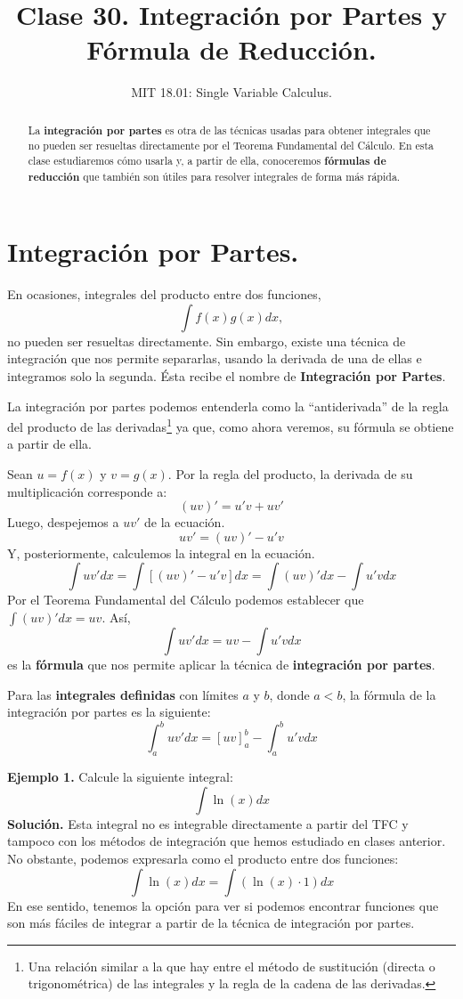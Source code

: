 \documentclass[12pt]{article}
\title{Clase 30. Integración por Partes y Fórmula de Reducción.}
\author{MIT 18.01: Single Variable Calculus.}
\date{}
\begin{document}
\maketitle

\begin{abstract}
\noindent La \textbf{integración por partes} es otra de las técnicas usadas para obtener integrales que no pueden ser resueltas directamente por el Teorema Fundamental del Cálculo. En esta clase estudiaremos cómo usarla y, a partir de ella, conoceremos \textbf{fórmulas de reducción} que también son útiles para resolver integrales de forma más rápida.
\end{abstract}

\section{Integración por Partes.}

En ocasiones, integrales del producto entre dos funciones,
\[
  \int f(x)g(x) dx,
\]
no pueden ser resueltas directamente. Sin embargo, existe una técnica de integración que nos permite separarlas, usando la derivada de una de ellas e integramos solo la segunda. Ésta recibe el nombre de \textbf{Integración por Partes}.

La integración por partes podemos entenderla como la ``antiderivada'' de la regla del producto de las derivadas\footnote{Una relación similar a la que hay entre el método de sustitución (directa o trigonométrica) de las integrales y la regla de la cadena de las derivadas.} ya que, como ahora veremos, su fórmula se obtiene a partir de ella.

Sean $u = f(x)$ y $v = g(x)$. Por la regla del producto, la derivada de su multiplicación corresponde a:
\[
  (uv)' = u'v + uv'
\]
Luego, despejemos a $uv'$ de la ecuación.
\[
  uv' = (uv)' - u'v
\]
Y, posteriormente, calculemos la integral en la ecuación.
\[
  \int uv' dx = \int [(uv)' - u'v] dx = \int (uv)' dx - \int u'v dx
\]
Por el Teorema Fundamental del Cálculo podemos establecer que $\int (uv)' dx = uv$. Así,
\[
  \int uv' dx = uv - \int u'v dx
\]
es la \textbf{fórmula} que nos permite aplicar la técnica de \textbf{integración por partes}.

Para las \textbf{integrales definidas} con límites $a$ y $b$, donde $a < b$, la fórmula de la integración por partes es la siguiente:
\[
  \int_{a}^{b} uv' dx = [uv]_{a}^{b} - \int_{a}^{b} u'v dx
\]

\textbf{Ejemplo 1.} Calcule la siguiente integral:
\[
  \int \ln(x) dx
\]
\textbf{Solución.} Esta integral no es integrable directamente a partir del TFC y tampoco con los métodos de integración que hemos estudiado en clases anterior. No obstante, podemos expresarla como el producto entre dos funciones:
\[
  \int \ln(x)dx = \int (\ln(x) \cdot 1) dx
\]
En ese sentido, tenemos la opción para ver si podemos encontrar funciones que son más fáciles de integrar a partir de la técnica de integración por partes.
\end{document}
